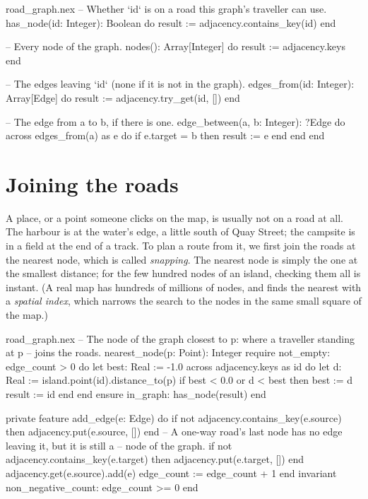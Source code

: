 \begin{continued}{road_graph.nex}
  -- Whether `id` is on a road this graph's traveller can use.
  has_node(id: Integer): Boolean do
    result := adjacency.contains_key(id)
  end

  -- Every node of the graph.
  nodes(): Array[Integer] do
    result := adjacency.keys
  end

  -- The edges leaving `id` (none if it is not in the graph).
  edges_from(id: Integer): Array[Edge] do
    result := adjacency.try_get(id, [])
  end

  -- The edge from a to b, if there is one.
  edge_between(a, b: Integer): ?Edge do
    across edges_from(a) as e do
      if e.target = b then
        result := e
      end
    end
  end
\end{continued}

\section{Joining the roads}

A place, or a point someone clicks on the map, is usually not on a road
at all. The harbour is at the water's edge, a little south of Quay
Street; the campsite is in a field at the end of a track. To plan a route
from it, we first join the roads at the nearest node, which is called
\emph{snapping}. The nearest node is simply the one at the smallest
distance; for the few hundred nodes of an island, checking them all is
instant. (A real map has hundreds of millions of nodes, and finds the
nearest with a \emph{spatial index}, which narrows the search to the
nodes in the same small square of the map.)

\begin{continued}{road_graph.nex}
  -- The node of the graph closest to p: where a traveller standing at p
  -- joins the roads.
  nearest_node(p: Point): Integer
  require
    not_empty: edge_count > 0
  do
    let best: Real := -1.0
    across adjacency.keys as id do
      let d: Real := island.point(id).distance_to(p)
      if best < 0.0 or d < best then
        best := d
        result := id
      end
    end
  ensure
    in_graph: has_node(result)
  end

private feature
  add_edge(e: Edge) do
    if not adjacency.contains_key(e.source) then
      adjacency.put(e.source, [])
    end
    -- A one-way road's last node has no edge leaving it, but it is still a
    -- node of the graph.
    if not adjacency.contains_key(e.target) then
      adjacency.put(e.target, [])
    end
    adjacency.get(e.source).add(e)
    edge_count := edge_count + 1
  end
invariant
  non_negative_count: edge_count >= 0
end
\end{continued}

